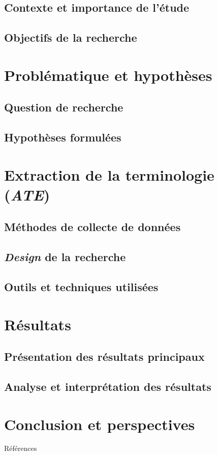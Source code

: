 \documentclass[xcolor={table,usenames,dvipsnames}]{beamer}
\begin{document}
\subsection[Contexte et importance de l'étude]{Contexte et importance de l'étude}

\subsection[Objectifs de la recherche]{Objectifs de la recherche}

\section[Problématique et hypothèses]{Problématique et hypothèses}
\subsection[Question de recherche]{Question de recherche}

\subsection[Hypothèses formulées]{Hypothèses formulées}

\section{Extraction de la terminologie (\textit{ATE})}
\subsection[Méthodes de collecte de donnée]{Méthodes de collecte de données}

\subsection[\textit{Design} de la recherche]{\textit{Design} de la recherche}


\subsection[Outils et techniques utilisées]{Outils et techniques utilisées}


\section{Résultats}
\subsection[Présentation des résultats principaux]{Présentation des résultats principaux}

\subsection[Analyse et interprétation des résultats]{Analyse et interprétation des résultats}

\section[Conclusion]{Conclusion et perspectives}



\begin{frame}[allowframebreaks]{Références}
\printbibliography

\end{frame}



\end{document}
